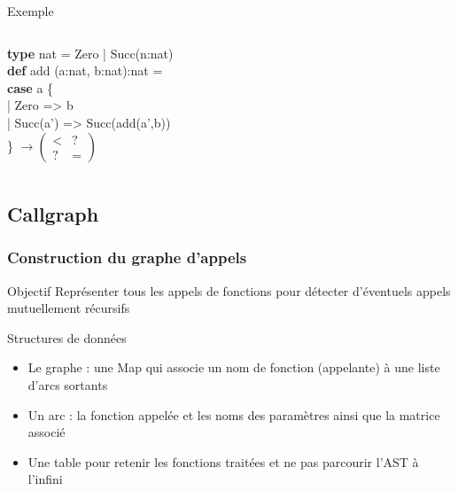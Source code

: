 \begin{frame}
  \begin{exampleblock}{Exemple}
    \begin{columns}
      \hspace{0,5cm}\textbf{type} nat = Zero | Succ(n:nat) \\
      \hspace{0,5cm}\textbf{def} add (a:nat, b:nat):nat = \\
      \hspace{0,5cm}\textbf{case} a \{ \\
      \hspace{0,7cm}| Zero => b \\
      \hspace{0,7cm}| Succ(a') => Succ(add(a',b)) \\
      \hspace{0,5cm}\}
      $
      \to
      \left(
        \begin{matrix}
          < & ? \\
          ? & =
        \end{matrix}
      \right)
      $
      \end{columns}
  \end{exampleblock}
\end{frame}

\subsection{Callgraph}
\begin{frame}
  \frametitle{Construction du graphe d'appels}
  \begin{block}{Objectif}
    Représenter tous les appels de fonctions pour détecter d'éventuels appels mutuellement récursifs
  \end{block}
  \begin{block}{Structures de données}
    \begin{itemize}
    \item Le graphe : une Map qui associe un nom de fonction (appelante) à une liste d'arcs sortants
    \item Un arc : la fonction appelée et les noms des paramètres
      ainsi que la matrice associé
    \item Une table pour retenir les fonctions traitées et ne pas parcourir l'AST à l'infini
    \end{itemize}
  \end{block}
\end{frame}

